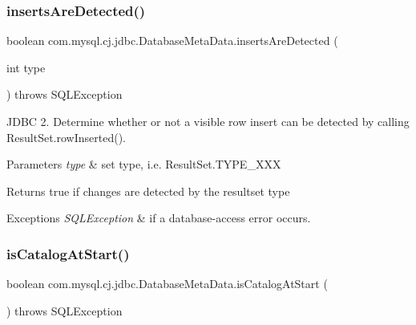\mbox{\label{classcom_1_1mysql_1_1cj_1_1jdbc_1_1_database_meta_data_ab83a53969a65b4a474c5ad0eac87ef4e}} 
\subsubsection{\texorpdfstring{inserts\+Are\+Detected()}{insertsAreDetected()}}
{\footnotesize\ttfamily boolean com.\+mysql.\+cj.\+jdbc.\+Database\+Meta\+Data.\+inserts\+Are\+Detected (\begin{DoxyParamCaption}\item[{int}]{type }\end{DoxyParamCaption}) throws S\+Q\+L\+Exception}

J\+D\+BC 2. Determine whether or not a visible row insert can be detected by calling Result\+Set.\+row\+Inserted().


\begin{DoxyParams}{Parameters}
{\em type} & set type, i.\+e. Result\+Set.\+T\+Y\+P\+E\+\_\+\+X\+XX \\
\hline
\end{DoxyParams}
\begin{DoxyReturn}{Returns}
true if changes are detected by the resultset type 
\end{DoxyReturn}

\begin{DoxyExceptions}{Exceptions}
{\em S\+Q\+L\+Exception} & if a database-\/access error occurs. \\
\hline
\end{DoxyExceptions}
\mbox{\label{classcom_1_1mysql_1_1cj_1_1jdbc_1_1_database_meta_data_a661d7d6feb31152148b6cdcb5b6b2ead}} 
\subsubsection{\texorpdfstring{is\+Catalog\+At\+Start()}{isCatalogAtStart()}}
{\footnotesize\ttfamily boolean com.\+mysql.\+cj.\+jdbc.\+Database\+Meta\+Data.\+is\+Catalog\+At\+Start (\begin{DoxyParamCaption}{ }\end{DoxyParamCaption}) throws S\+Q\+L\+Exception}

